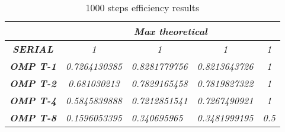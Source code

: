 \begin{table}
    \centering
    \begin{tabular}{|c|c|c|c|c|} 
    \hline
                                                    & \multicolumn{4}{c|}{\textbf{\textit{Max theoretical}}}                                                                                                                   \\ 
    \hline
    \textbf{\textit{SERIAL}}                        & \textit{1}                                 & \textit{1}                                & \textit{1}                                 & \textit{1}                         \\ 
    \hline
    \textbf{\textit{OMP T-1}}                       & \textit{0.7264130385}                      & \textit{0.8281779756}                     & \textit{0.8213643726}                      & \textit{1}                         \\ 
    \hline
    \textbf{\textit{OMP T-2}}                       & \textit{0.681030213}                       & \textit{0.7829165458}                     & \textit{0.7819827322}                      & \textit{1}                         \\ 
    \hline
    \textbf{\textit{OMP T-4}}                       & \textit{0.5845839888}                      & \textit{0.7212851541}                     & \textit{0.7267490921}                      & \textit{1}                         \\ 
    \hline
    \multicolumn{1}{|l|}{\textbf{\textit{OMP T-8}}} & \multicolumn{1}{l|}{\textit{0.1596053395}} & \multicolumn{1}{l|}{\textit{0.340695965}} & \multicolumn{1}{l|}{\textit{0.3481999195}} & \multicolumn{1}{l|}{\textit{0.5}}  \\
    \hline
    \end{tabular}
    \caption{1000 steps efficiency results}
    \end{table}